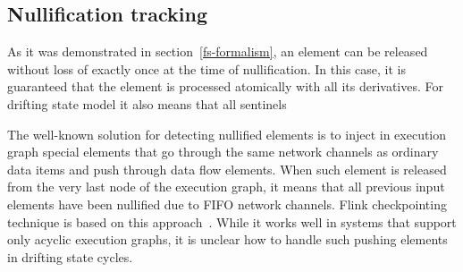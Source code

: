 

\subsection{Nullification tracking}

As it was demonstrated in section~\ref{fs-formalism}, an element can be released without loss of exactly once at the time of nullification. In this case, it is guaranteed that the element is processed atomically with all its derivatives. For drifting state model it also means that all sentinels 



The well-known solution for detecting nullified elements is to inject in execution graph special elements that go through the same network channels as ordinary data items and push through data flow elements. When such element is released from the very last node of the execution graph, it means that all previous input elements have been nullified due to FIFO network channels. Flink checkpointing technique is based on this approach~\cite{Carbone:2017:SMA:3137765.3137777}. While it works well in systems that support only acyclic execution graphs, it is unclear how to handle such pushing elements in drifting state cycles. 

